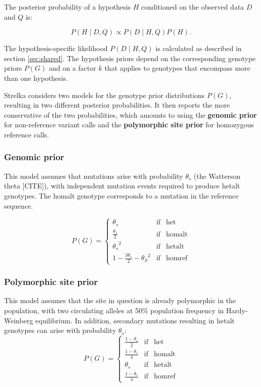 \documentclass{article}
\begin{document}
The posterior probability of a hypothesis $H$ conditioned on the observed data $D$ and $Q$ is:

\begin{equation}
\label{eq:posterior}
P(H \mid D,Q) \propto P(D \mid H,Q)P(H).
\end{equation}

The hypothesis-specific likelihood $P(D \mid H,Q)$ is calculated as described in section \ref{sec:shared}. The hypothesis priors depend on the corresponding genotype priors $P(G)$ and on a factor $k$ that applies to genotypes that encompass more than one hypothesis.

Strelka considers two models for the genotype prior distributions $P(G)$, resulting in two different posterior probabilities. It then reports the more conservative of the two probabilities, which amounts to using the {\bf genomic prior} for non-reference variant calls and the {\bf polymorphic site prior} for homozygous reference calls.

\subsubsection{Genomic prior}
This model assumes that mutations arise with probability $\theta_s$ (the Watterson theta [CITE]), with independent mutation events required to produce hetalt genotypes. The homalt genotype corresponds to a mutation in the reference sequence.

\begin{equation}
P(G) = \left\{
\begin{array}{lcl}
\theta_s & \mathrm{if} & \mathrm{het}\\
\frac{\theta_s}{2} & \mathrm{if} & \mathrm{homalt}\\
{\theta_s}^2 & \mathrm{if} & \mathrm{hetalt}\\
1-\frac{3\theta_s}{2}-{\theta_S}^2 & \mathrm{if} & \mathrm{homref}
\end{array} \right.
\end{equation}

\subsubsection{Polymorphic site prior}
This model assumes that the site in question is already polymorphic in the population, with two circulating alleles at 50\% population frequency in Hardy-Weinberg equilibrium. In addition, secondary mutations resulting in hetalt genotypes can arise with probability $\theta_s$:
\begin{equation}
P(G) = \left\{
\begin{array}{lcl}
\frac{1-\theta_s}{2} & \mathrm{if} & \mathrm{het}\\
\frac{1-\theta_s}{4} & \mathrm{if} & \mathrm{homalt}\\
\theta_s & \mathrm{if} & \mathrm{hetalt}\\
\frac{1-\theta_s}{4} & \mathrm{if} & \mathrm{homref}
\end{array} \right.
\end{equation}
\end{document}
